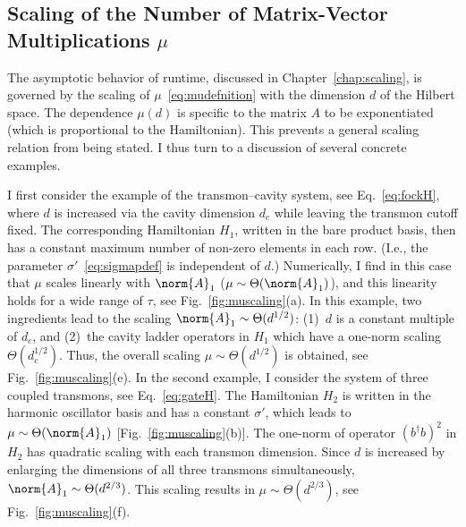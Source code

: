 \pagestyle{fancy}
\begin{appendices}


\thispagestyle{fancy}


\chapter{Scaling of the Number of Matrix-Vector Multiplications $\mu$}
\label{app:muscaling}

The asymptotic behavior of runtime, discussed in Chapter~\ref{chap:scaling}, is governed by the scaling of $\mu$~\eqref{eq:mudefnition} with the dimension $d$ of the Hilbert space. The dependence $\mu(d)$ is specific to the matrix $A$ to be exponentiated (which is proportional to the Hamiltonian). This prevents a general scaling relation from being stated. I thus turn to a discussion of several concrete examples. 

I first consider the example of the transmon--cavity system, see Eq.~\eqref{eq:fockH}, where $d$ is increased via the cavity dimension $d_c$ while leaving the transmon cutoff fixed. The corresponding Hamiltonian $H_1$, written in the bare product basis, then has a constant maximum number of non-zero elements in each row. (I.e., the parameter $\sigma'$~\eqref{eq:sigmapdef} is independent of $d$.) Numerically, I find in this case that $\mu$ scales linearly with $\norm{A}_1$ \big($\mu\sim\Theta(\norm{A}_1)$\big), and this linearity holds for a wide range of $\tau$, see Fig.~\ref{fig:muscaling}(a). In this example, two ingredients lead to the scaling $\norm{A}_1\sim \Theta(d^{1/2})$: (1)~$d$ is a constant multiple of $d_c$, and (2)~the cavity ladder operators in $H_1$ which have a one-norm scaling $\Theta(d_c^{1/2})$. Thus, the overall scaling $\mu\sim \Theta(d^{1/2})$ is obtained, see Fig.~\ref{fig:muscaling}(e). In the second example, I consider the system of three coupled transmons, see Eq.~\eqref{eq:gateH}. The Hamiltonian $H_2$ is written in the harmonic oscillator basis and has a constant $\sigma'$, which leads to $\mu\sim\Theta(\norm{A}_1)$ [Fig.~\ref{fig:muscaling}(b)]. The one-norm of operator $(b^\dagger b)^2$ in $H_2$ has quadratic scaling with each transmon dimension. Since $d$ is increased by enlarging the dimensions of all three transmons simultaneously, $\norm{A}_1\sim\Theta(d^{2/3})$. This scaling results in $\mu\sim \Theta(d^{2/3})$, see Fig.~\ref{fig:muscaling}(f).


\end{appendices}
